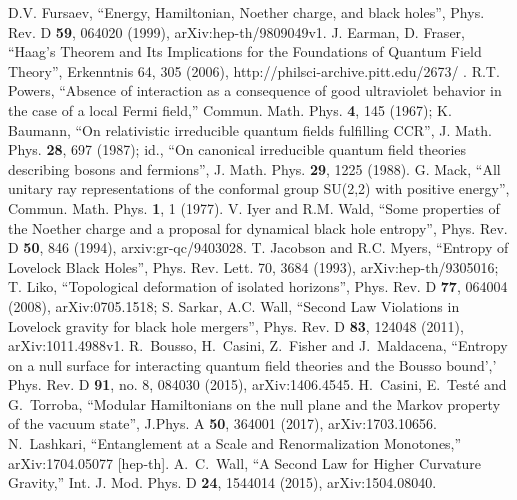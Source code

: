 \documentclass{article}
\begin{document}
\begin{thebibliography}{299}
D.V. Fursaev, ``Energy, Hamiltonian, Noether charge, and black holes'', Phys. Rev. D \textbf{59}, 064020 (1999), arXiv:hep-th/9809049v1.
J. Earman, D. Fraser, ``Haag's Theorem and Its Implications for the Foundations of Quantum Field Theory'', Erkenntnis 64, 305 (2006), http://philsci-archive.pitt.edu/2673/ .
R.T. Powers, ``Absence of interaction as a consequence of good ultraviolet behavior in the case of a local Fermi field,'' Commun. Math. Phys. \textbf{4}, 145 (1967); K. Baumann, ``On relativistic irreducible quantum fields fulfilling CCR'', J. Math. Phys. \textbf{28}, 697 (1987); id., ``On canonical irreducible quantum field theories describing bosons and fermions'', J. Math. Phys. \textbf{29}, 1225 (1988).
G. Mack, ``All unitary ray representations of the conformal group SU(2,2) with positive energy'', Commun. Math. Phys. \textbf{1}, 1 (1977).
V. Iyer and R.M. Wald, ``Some properties of the Noether charge and a proposal for dynamical black hole entropy'', Phys. Rev. D \textbf{50}, 846 (1994), arxiv:gr-qc/9403028.
T. Jacobson and R.C. Myers, ``Entropy of Lovelock Black Holes'', Phys. Rev. Lett. 70, 3684 (1993),
arXiv:hep-th/9305016;
T. Liko, ``Topological deformation of isolated horizons'', Phys. Rev. D \textbf{77}, 064004 (2008), arXiv:0705.1518; S. Sarkar, A.C. Wall, ``Second Law Violations in Lovelock gravity for black hole mergers'', Phys. Rev. D \textbf{83}, 124048 (2011), arXiv:1011.4988v1.
  R.~Bousso, H.~Casini, Z.~Fisher and J.~Maldacena,
  ``Entropy on a null surface for interacting quantum field theories and the Bousso bound','
  Phys. Rev. D {\bf 91}, no. 8, 084030 (2015),
  arXiv:1406.4545.
  H.~Casini, E.~Test\'e and G.~Torroba,
  ``Modular Hamiltonians on the null plane and the Markov property of the vacuum state'', J.Phys. A \textbf{50}, 364001 (2017),
  arXiv:1703.10656.
  N.~Lashkari,
  ``Entanglement at a Scale and Renormalization Monotones,''
  arXiv:1704.05077 [hep-th].
  A.~C.~Wall,
  ``A Second Law for Higher Curvature Gravity,''
  Int. J. Mod. Phys. D {\bf 24}, 1544014 (2015),
  arXiv:1504.08040.

\end{thebibliography}
\end{document}
